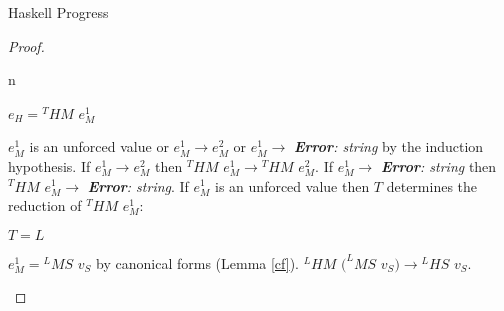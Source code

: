 \begin{theorem}{Haskell Progress}
\begin{proof}
\begin{case}{\pspnull}
\end{case}


\newcommand{\psif}{\expif{\first{\varexph}}{\second{\varexph}}{\third{\varexph}}\xspace}
\renewcommand{\x}{\expnum{\varnum}\xspace}

\begin{case}{\psif}

\pshypref
{\first{\varexph}}
{\fourth{\varexph}}
\psval
{\first{\varexph}}
{\tynum}
{\x}
\psred
{}
{\second{\varexph}}
\psrednote
{\expif{\x}{\second{\varexph}}{\third{\varexph}}}
{\third{\varexph}}
{n }
\pssub
{\first{\varexph}}
{\fourth{\varexph}}
{\psif}
{\expif{\fourth{\varexph}}{\second{\varexph}}{\third{\varexph}}}
\pserr
{\first{\varexph}}
{\psif}

\end{case}


\newcommand{\pswrongs}{\expwrongs{\vartyh}{\varstr}\xspace}

\begin{case}{\pswrongs}

\psred
{\pswrongs}
{\emph{\experr{\varstr}}}

\end{case}


\begin{case}

$e_{H}={^{T}H}M$ $e_{M}^{1}$

$e_{M}^{1}$ is an unforced value or $e_{M}^{1}\rightarrow e_{M}^{2}$ or $e_{M}^{1}\rightarrow$ \emph{\textbf{Error}: string} by the induction hypothesis.  If $e_{M}^{1}\rightarrow e_{M}^{2}$ then $^{T}HM$ $e_{M}^{1}\rightarrow{^{T}H}M$ $e_{M}^{2}$.  If $e_{M}^{1}\rightarrow$ \emph{\textbf{Error}: string} then $^{T}HM$ $e_{M}^{1}\rightarrow$ \emph{\textbf{Error}: string}.  If $e_{M}^{1}$ is an unforced value then $T$ determines the reduction of $^{T}HM$ $e_{M}^{1}$:

\begin{subcase}

$T=L$

$e_{M}^{1}={^{L}M}S$ $v_{S}$ by canonical forms (Lemma \ref{cf}).  $^{L}HM$ $(^{L}MS$ $v_{S})\rightarrow{^{L}H}S$ $v_{S}$.

\end{subcase}

\begin{subcase}


\end{subcase}
\end{case}
\end{proof}
\end{theorem}

